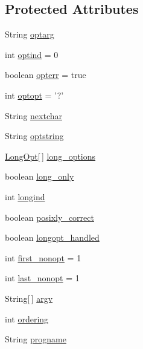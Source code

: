 \subsection*{Protected Attributes}
\begin{DoxyCompactItemize}
\item 
String \hyperlink{classgnu_1_1getopt_1_1_getopt_a1b9f80db609f412ec4650ca9a8280882}{optarg}
\item 
int \hyperlink{classgnu_1_1getopt_1_1_getopt_ae80c10d8bfc957fd93bec2f3619cbf18}{optind} = 0
\item 
boolean \hyperlink{classgnu_1_1getopt_1_1_getopt_a8712d370a08f90b7b49b0261a2df8581}{opterr} = true
\item 
int \hyperlink{classgnu_1_1getopt_1_1_getopt_ac9bb6ef79a5d0467f38cdf2ac07c51ef}{optopt} = '?'
\item 
String \hyperlink{classgnu_1_1getopt_1_1_getopt_a94938d6f4baca982818fc56f9e9ee959}{nextchar}
\item 
String \hyperlink{classgnu_1_1getopt_1_1_getopt_a3a731b226188580b7cf0928b97d0502d}{optstring}
\item 
\hyperlink{classgnu_1_1getopt_1_1_long_opt}{LongOpt}\mbox{[}$\,$\mbox{]} \hyperlink{classgnu_1_1getopt_1_1_getopt_a5baa01494994d09203b475edd9c9eb98}{long\_\-options}
\item 
boolean \hyperlink{classgnu_1_1getopt_1_1_getopt_a81e9a30f84d4dc8e7b28e1d1dcecbd4c}{long\_\-only}
\item 
int \hyperlink{classgnu_1_1getopt_1_1_getopt_af0fee3aa183afb5b5326894bf0c25f64}{longind}
\item 
boolean \hyperlink{classgnu_1_1getopt_1_1_getopt_a2500f828284f39e5daf994a11be3ffe5}{posixly\_\-correct}
\item 
boolean \hyperlink{classgnu_1_1getopt_1_1_getopt_a156f519421b9d7707adee504e0bafac8}{longopt\_\-handled}
\item 
int \hyperlink{classgnu_1_1getopt_1_1_getopt_a2af5425ca486d7546c261d5f9f45ed26}{first\_\-nonopt} = 1
\item 
int \hyperlink{classgnu_1_1getopt_1_1_getopt_aaca077ce23c672df0a638fbb63898446}{last\_\-nonopt} = 1
\item 
String\mbox{[}$\,$\mbox{]} \hyperlink{classgnu_1_1getopt_1_1_getopt_adde2117f0df42f3254b37b05fd9833cf}{argv}
\item 
int \hyperlink{classgnu_1_1getopt_1_1_getopt_a9512cc64df132d096957ae7f24f5480d}{ordering}
\item 
String \hyperlink{classgnu_1_1getopt_1_1_getopt_aef9686af24b220286d279467d2741a6d}{progname}
\end{DoxyCompactItemize}
